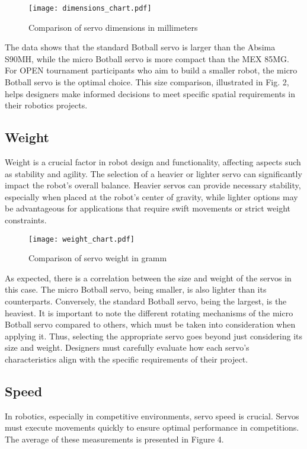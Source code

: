 \documentclass[conference]{IEEEtran}
\begin{document}
        \begin{figure}[htbp]
            \centering
            \texttt{[image: dimensions\_chart.pdf]}
            \caption{Comparison of servo dimensions in millimeters}
        \end{figure}

        The data shows that the standard Botball servo is larger than the Absima S90MH, while the micro Botball servo is more compact than the MEX 85MG. For OPEN tournament participants who aim to build a smaller robot, the micro Botball servo is the optimal choice. This size comparison, illustrated in Fig. 2, helps designers make informed decisions to meet specific spatial requirements in their robotics projects.

    \subsection{Weight}
        Weight is a crucial factor in robot design and functionality, affecting aspects such as stability and agility. The selection of a heavier or lighter servo can significantly impact the robot's overall balance. Heavier servos can provide necessary stability, especially when placed at the robot's center of gravity, while lighter options may be advantageous for applications that require swift movements or strict weight constraints.

        \begin{figure}[htbp]
            \centering
            \texttt{[image: weight\_chart.pdf]}
            \caption{Comparison of servo weight in gramm}
        \end{figure}

       As expected, there is a correlation between the size and weight of the servos in this case. The micro Botball servo, being smaller, is also lighter than its counterparts. Conversely, the standard Botball servo, being the largest, is the heaviest. It is important to note the different rotating mechanisms of the micro Botball servo compared to others, which must be taken into consideration when applying it. Thus, selecting the appropriate servo goes beyond just considering its size and weight. Designers must carefully evaluate how each servo's characteristics align with the specific requirements of their project.

    \subsection{Speed}
        In robotics, especially in competitive environments, servo speed is crucial. Servos must execute movements quickly to ensure optimal performance in competitions. The average of these measurements is presented in Figure 4.
\end{document}
